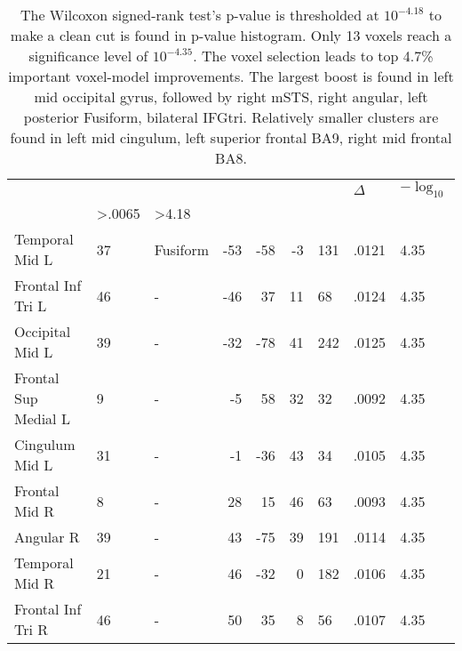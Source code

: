 \begin{table}
    \small
    \centering
    \begin{ThreePartTable}
        \begin{tabularx}{\textwidth}{l l p{1.5cm} *{3}{r} *{2}{P{1.2cm}}P{1.4cm}}
             \\
    \toprule
     &  &  &  &  &  &  & \(\Delta\)  & \(-\log_{10}\) \\
    
    \toprule
      &  >.0065 & >4.18   \\
    \midrule
    Temporal Mid L & 37 & Fusiform & -53 & -58 & -3 & 131 & .0121 & 4.35\\
    Frontal Inf Tri L & 46 & - & -46 & 37 & 11 & 68 & .0124 & 4.35 \\
    Occipital Mid L & 39 & - & -32 & -78 & 41 & 242 & .0125 & 4.35 \\
    Frontal Sup Medial L & 9 & - & -5 & 58 & 32 & 32 & .0092 & 4.35 \\
    Cingulum Mid L & 31 & - & -1 & -36 & 43 & 34 & .0105 & 4.35  \\
    Frontal Mid R & 8 & - & 28 & 15 & 46 & 63 & .0093 & 4.35  \\
    Angular R & 39 & - & 43 & -75 & 39 & 191 & .0114 & 4.35  \\
    Temporal Mid R & 21 & - & 46 & -32 & 0 & 182 & .0106 & 4.35 \\
    Frontal Inf Tri R & 46 & - & 50 & 35 & 8 & 56 & .0107  & 4.35\\
\bottomrule
    \end{tabularx}
\end{ThreePartTable}
\caption[ Voxel Improvement Clusters]{The Wilcoxon signed-rank test's p-value is thresholded at \(10^{-4.18}\) to make a clean cut is found in p-value histogram. Only 13 voxels reach a significance level of \(10^{-4.35}\). The voxel selection leads to top 4.7\% important voxel-model improvements. The largest  boost is found in left mid occipital gyrus, followed by right mSTS, right angular, left posterior Fusiform, bilateral IFGtri. Relatively smaller clusters are found in left mid cingulum, left superior frontal BA9, right mid frontal BA8.  \label{tab:asnImprovementClusters}}
\end{table}